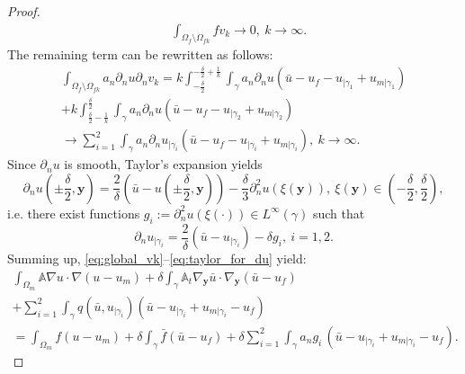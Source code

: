 \documentclass[a4paper]{article}
\def\vc#1{\mathbf{\boldsymbol{#1}}}     %
\def\tn#1{{\mathbb{#1}}}    %
\def\yy{{\vc y}}
\begin{document}
\begin{proof}
\begin{align}
&\int_{\Omega_f\setminus\Omega_{fk}} f v_k \to 0,~k\to\infty.
\end{align}
The remaining term can be rewritten as follows:
\begin{multline}
\int_{\Omega_f\setminus\Omega_{fk}} a_n\partial_n u \partial_n v_k
= k\int_{-\frac\delta2}^{-\frac\delta2+\frac1k}\int_\gamma a_n\partial_n u (\bar u - u_f - u_{|\gamma_1} + u_{m|\gamma_1})\\
+ k\int_{\frac\delta2-\frac1k}^{\frac\delta2}\int_\gamma a_n\partial_n u (\bar u - u_f - u_{|\gamma_2} + u_{m|\gamma_2})\\
\to \sum_{i=1}^2\int_\gamma a_n \partial_n u_{|\gamma_i} (\bar u - u_f - u_{|\gamma_i} + u_{m|\gamma_i}),~k\to\infty.
\end{multline}
Since $\partial_n u$ is smooth, Taylor's expansion yields
\[ \partial_n u(\pm\frac\delta2,\vc y) = \frac2\delta(\bar u - u(\pm\frac\delta2,\vc y)) - \frac\delta3\partial_n^2 u(\xi(\vc y)),~\xi(\yy)\in(-\frac\delta2,\frac\delta2), \]
i.e. there exist functions $g_i:=\partial^2_n u(\xi(\cdot))\in L^\infty(\gamma)$ such that
\begin{equation}
\label{eq:taylor_for_du}
\partial_n u_{|\gamma_i} = \frac2\delta(\bar u - u_{|\gamma_i}) - \delta g_i,~i=1,2.
\end{equation}
Summing up, \eqref{eq:global_vk}--\eqref{eq:taylor_for_du} yield:
\begin{multline}
\label{eq:sum_global_vk_limit}
\int_{\Omega_m}\tn A\nabla u\cdot\nabla(u-u_m)
+\delta\int_\gamma\tn A_t\nabla_\yy\bar u\cdot\nabla_\yy(\bar u-u_f)\\
+ \sum_{i=1}^2\int_\gamma q(\bar u,u_{|\gamma_i}) (\bar u - u_{|\gamma_i} + u_{m|\gamma_i} - u_f)\\
= \int_{\Omega_m} f (u-u_m)
+ \delta\int_{\gamma} \bar f (\bar u-u_f)
+ \delta\sum_{i=1}^2\int_\gamma a_n g_i\, (\bar u - u_{|\gamma_i} + u_{m|\gamma_i} - u_f).
\end{multline}


\end{proof}
\end{document}
